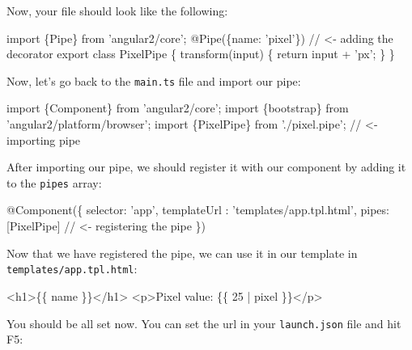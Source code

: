 \documentclass[12pt,]{article}
\newenvironment{Shaded}{}{}
\newcommand{\KeywordTok}[1]{\textcolor[rgb]{0.00,0.00,1.00}{{#1}}}
\newcommand{\CommentTok}[1]{\textcolor[rgb]{0.00,0.50,0.00}{{#1}}}
\newcommand{\FunctionTok}[1]{{#1}}
\newcommand{\NormalTok}[1]{{#1}}
\begin{document}
Now, your file should look like the following:

\begin{Shaded}
\begin{Highlighting}[numbers=left,,]
\KeywordTok{import \{Pipe\} from 'angular2/core';}
\FunctionTok{@Pipe}\NormalTok{(\{name: 'pixel'\}) }\CommentTok{// <- adding the decorator}
\NormalTok{export }\KeywordTok{class} \NormalTok{PixelPipe \{}
  \FunctionTok{transform}\NormalTok{(input) \{}
    \KeywordTok{return} \NormalTok{input + 'px';}
  \NormalTok{\}}
\NormalTok{\}}
\end{Highlighting}
\end{Shaded}

Now, let's go back to the \texttt{main.ts} file and import our pipe:

\begin{Shaded}
\begin{Highlighting}[numbers=left,,]
\KeywordTok{import \{Component\} from 'angular2/core';}
\KeywordTok{import \{bootstrap\} from 'angular2/platform/browser';}
\KeywordTok{import \{PixelPipe\} from './pixel.pipe';} \CommentTok{// <- importing pipe}
\end{Highlighting}
\end{Shaded}

After importing our pipe, we should register it with our component by
adding it to the \texttt{pipes} array:

\begin{Shaded}
\begin{Highlighting}[numbers=left,,]
\FunctionTok{@Component}\NormalTok{(\{}
  \NormalTok{selector: 'app',}
  \NormalTok{templateUrl : 'templates/app.}\FunctionTok{tpl}\NormalTok{.}\FunctionTok{html}\NormalTok{',}
  \NormalTok{pipes: [PixelPipe] }\CommentTok{// <- registering the pipe}
\NormalTok{\})}
\end{Highlighting}
\end{Shaded}

Now that we have registered the pipe, we can use it in our template in
\texttt{templates/app.tpl.html}:

\begin{Shaded}
\begin{Highlighting}[numbers=left,,]
\KeywordTok{<h1>}\NormalTok{\{\{ name \}\}}\KeywordTok{</h1>}
\KeywordTok{<p>}\NormalTok{Pixel value: \{\{ 25 | pixel \}\}}\KeywordTok{</p>}
\end{Highlighting}
\end{Shaded}

You should be all set now. You can set the url in your
\texttt{launch.json} file and hit F5:
\end{document}
